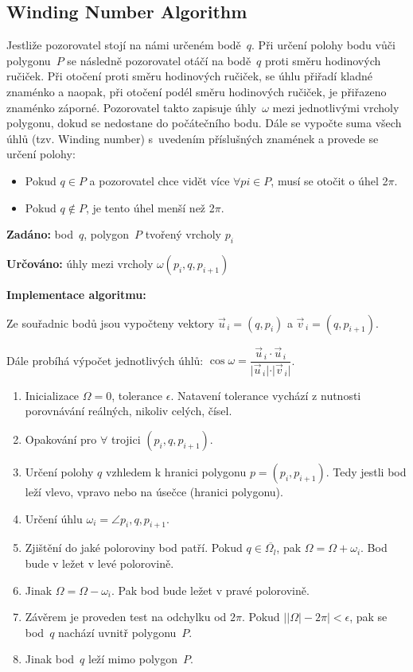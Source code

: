 \documentclass[a4paper, 12pt, oneside, titlepage]{article} %
\begin{document}
\subsection{Winding Number Algorithm}
Jestliže pozorovatel stojí na námi určeném bodě~$q$. Při určení polohy bodu vůči polygonu~$P$ se následně pozorovatel otáčí na bodě~$q$ proti směru hodinových ručiček. Při otočení proti směru hodinových ručiček, se úhlu přiřadí kladné znaménko a naopak, při otočení podél směru hodinových ručiček, je přiřazeno znaménko záporné. Pozorovatel takto zapisuje úhly~$\omega$ mezi jednotlivými vrcholy polygonu, dokud se nedostane do počátečního bodu. Dále se vypočte suma všech úhlů (tzv. Winding number) s~uvedením příslušných znamének a provede se určení polohy: 
\begin{itemize}
\item Pokud $q \in P$ a pozorovatel chce vidět více $\forall pi \in P$, musí se otočit o úhel 2$\pi$.
\item Pokud $q \notin P$, je tento úhel menší než 2$\pi$.
\end{itemize}


\noindent\textbf{Zadáno:} bod~$q$, polygon~$P$ tvořený vrcholy $p_i$

\noindent\textbf{Určováno:} úhly mezi vrcholy $\omega(p_i,q,p_{i+1} )$

\noindent\textbf{Implementace algoritmu:}

Ze souřadnic bodů jsou vypočteny vektory $\vec{u}_{\,i} = (q,p_i)$ a $\vec{v}_{\,i} = (q,p_{i+1})$. 

Dále probíhá výpočet jednotlivých úhlů: $\cos\omega = \dfrac{\vec{u}_{\,i}\cdot\vec{u}_{\,i}}{\vert\vec{u}_{\,i}\vert\cdot\vert\vec{v}_{\,i}\vert}$.

\begin{enumerate}
  \item Inicializace $\Omega = 0$, tolerance $\epsilon$. Natavení tolerance vychází z nutnosti porovnávání reálných, nikoliv celých, čísel.
  \item Opakování pro $\forall$ trojici $(p_i,q,p_{i+1} )$.
  \item \quad Určení polohy $q$ vzhledem k hranici polygonu $p = (p_i, p_{i+1})$. Tedy jestli bod leží vlevo, vpravo nebo na úsečce (hranici polygonu).
  \item \quad Určení úhlu $\omega_i = \angle p_i,q, p_{i+1}$.
  \item \quad Zjištění do jaké poloroviny bod patří. Pokud $q \in \overline{\Omega_l}$, pak $\Omega = \Omega + \omega_i$. Bod bude v ležet v levé polorovině.
  \item \quad Jinak $\Omega = \Omega - \omega_i$. Pak bod bude ležet v pravé polorovině. 
  \item Závěrem je proveden test na odchylku od $2\pi$. Pokud $\vert\vert\Omega\vert - 2\pi\vert < \epsilon$, pak se bod~$q$ nachází uvnitř polygonu~$P$.
  \item Jinak bod~$q$ leží mimo polygon~$P$.
\end{enumerate}
\end{document}
